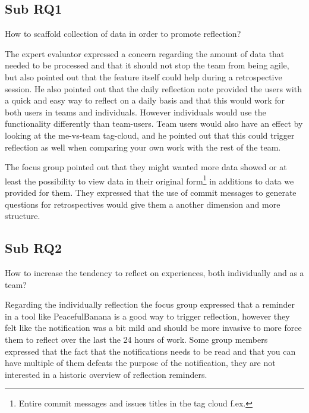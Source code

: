 \subsection{Sub RQ1}
\noindent\makebox[\linewidth]{\rule{\textwidth}{0.5pt}} 

\begin{center}
    How to scaffold collection of data in order to promote reflection? 
\end{center}

\noindent\makebox[\linewidth]{\rule{\textwidth}{0.5pt}} 
The expert evaluator expressed a concern regarding the amount of data that needed to be processed and that it should not stop the team from being agile, but also pointed out that the feature itself could help during a retrospective session. He also pointed out that the daily reflection note provided the users with a quick and easy way to reflect on a daily basis and that this would work for both users in teams and individuals. However individuals would use the functionality differently than team-users. Team users would also have an effect by looking at the me-vs-team tag-cloud, and he pointed out that this could trigger reflection as well when comparing your own work with the rest of the team.

The focus group pointed out that they might wanted more data showed or at least the possibility to view data in their original form\footnote{Entire commit messages and issues titles in the tag cloud f.ex.} in additions to data we provided for them. They expressed that the use of commit messages to generate questions for retrospectives would give them a another dimension and more structure.

\subsection{Sub RQ2}
\noindent\makebox[\linewidth]{\rule{\textwidth}{0.5pt}} 

\begin{center}
How to increase the tendency to reflect on experiences, both individually and as a team? \\
\end{center}  

\noindent\makebox[\linewidth]{\rule{\textwidth}{0.5pt}}
Regarding the individually reflection the focus group expressed that a reminder in a tool like PeacefulBanana is a good way to trigger reflection, however they felt like the notification was a bit mild and should be more invasive to more force them to reflect over the last the 24 hours of work. Some group members expressed that the fact that the notifications needs to be read and that you can have multiple of them defeats the purpose of the notification, they are not interested in a historic overview of reflection reminders. 

